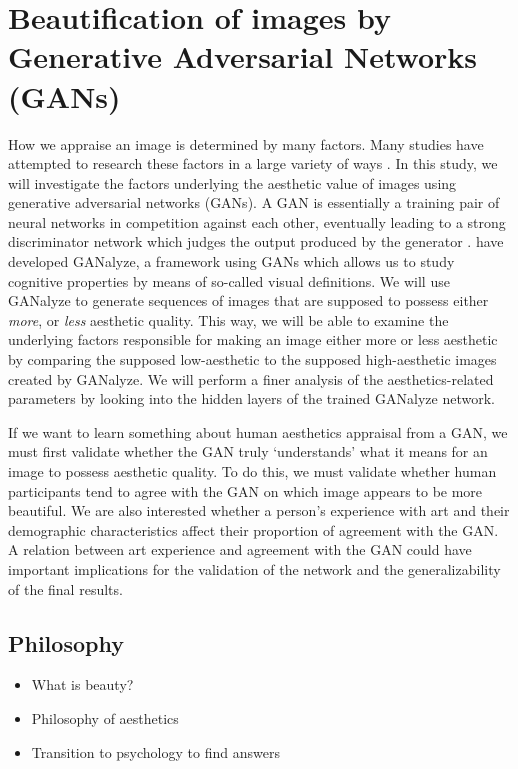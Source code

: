 \documentclass[../main.tex]{subfiles}
\begin{document}
\section{Beautification of images by Generative Adversarial Networks (GANs)}
How we appraise an image is determined by many factors. Many studies have attempted to research these factors in a large variety of ways \parencite{deng2017image}. In this study, we will investigate the factors underlying the aesthetic value of images using generative adversarial networks (GANs). A GAN is essentially a training pair of neural networks in competition against each other, eventually leading to a strong discriminator network which judges the output produced by the generator \parencite{creswellGenerativeAdversarialNetworks2018}. \textcite{goetschalckxGANalyzeVisualDefinitions2019} have developed GANalyze, a framework using GANs which allows us to study cognitive properties by means of so-called visual definitions. We will use GANalyze to generate sequences of images that are supposed to possess either \textit{more}, or \textit{less} aesthetic quality. This way, we will be able to examine the underlying factors responsible for making an image either more or less aesthetic by comparing the supposed low-aesthetic to the supposed high-aesthetic images created by GANalyze. We will perform a finer analysis of the aesthetics-related parameters by looking into the hidden layers of the trained GANalyze network.

If we want to learn something about human aesthetics appraisal from a GAN, we must first validate whether the GAN truly `understands' what it means for an image to possess aesthetic quality. To do this, we must validate whether human participants tend to agree with the GAN on which image appears to be more beautiful. We are also interested whether a person's experience with art and their demographic characteristics affect their proportion of agreement with the GAN. A relation between art experience and agreement with the GAN could have important implications for the validation of the network and the generalizability of the final results.

	\subsection{Philosophy}
		\begin{itemize}
			\item What is beauty?
			\item Philosophy of aesthetics
			\item Transition to psychology to find answers
		\end{itemize}
	
\end{document}
